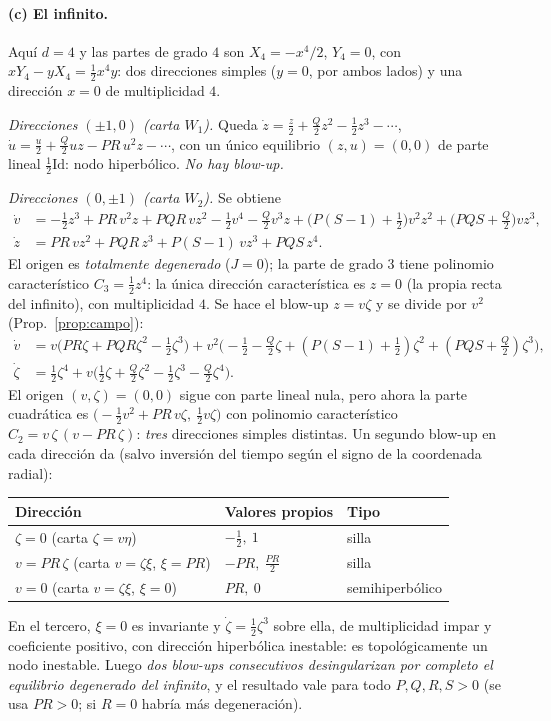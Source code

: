 \documentclass[11pt,a4paper,oneside]{book}
\theoremstyle{plain}
\theoremstyle{definition}
\theoremstyle{remark}
\begin{document}
\paragraph{(c) El infinito.} Aquí $d=4$ y las partes de grado $4$ son $X_4=-x^4/2$, $Y_4=0$, con $xY_4-yX_4=\tfrac12x^4y$: dos direcciones simples ($y=0$, por ambos lados) y una dirección $x=0$ de multiplicidad $4$.

\emph{Direcciones $(\pm1,0)$ (carta $W_1$).} Queda $\dot z=\tfrac z2+\tfrac Q2z^2-\tfrac12z^3-\cdots$, $\dot u=\tfrac u2+\tfrac Q2uz-PR\,u^2z-\cdots$, con un único equilibrio $(z,u)=(0,0)$ de parte lineal $\tfrac12\mathrm{Id}$: nodo hiperbólico. \emph{No hay blow-up.}

\emph{Direcciones $(0,\pm1)$ (carta $W_2$).} Se obtiene
\begin{align*}
\dot v&=-\tfrac12z^3+PR\,v^2z+PQR\,vz^2-\tfrac12v^4-\tfrac Q2v^3z+\big(P(S-1)+\tfrac12\big)v^2z^2+\big(PQS+\tfrac Q2\big)vz^3,\\
\dot z&=PR\,vz^2+PQR\,z^3+P(S-1)\,vz^3+PQS\,z^4 .
\end{align*}
El origen es \emph{totalmente degenerado} ($J=0$); la parte de grado $3$ tiene polinomio característico $C_3=\tfrac12z^4$: la única dirección característica es $z=0$ (la propia recta del infinito), con multiplicidad $4$. Se hace el blow-up $z=v\zeta$ y se divide por $v^2$ (Prop.~\ref{prop:campo}):
\begin{align*}
\dot v&=v\big(PR\zeta+PQR\zeta^2-\tfrac12\zeta^3\big)+v^2\big(-\tfrac12-\tfrac Q2\zeta+(P(S-1)+\tfrac12)\zeta^2+(PQS+\tfrac Q2)\zeta^3\big),\\
\dot\zeta&=\tfrac12\zeta^4+v\big(\tfrac12\zeta+\tfrac Q2\zeta^2-\tfrac12\zeta^3-\tfrac Q2\zeta^4\big).
\end{align*}
El origen $(v,\zeta)=(0,0)$ sigue con parte lineal nula, pero ahora la parte cuadrática es $\big(-\tfrac12v^2+PR\,v\zeta,\ \tfrac12v\zeta\big)$ con polinomio característico $C_2=v\,\zeta\,(v-PR\,\zeta)$: \emph{tres} direcciones simples distintas. Un segundo blow-up en cada dirección da (salvo inversión del tiempo según el signo de la coordenada radial):
\begin{center}
\begin{tabular}{@{}l l l@{}}
\toprule
Dirección & Valores propios & Tipo \\
\midrule
$\zeta=0$ (carta $\zeta=v\eta$) & $-\tfrac12,\ 1$ & silla \\
$v=PR\,\zeta$ (carta $v=\zeta\xi$, $\xi=PR$) & $-PR,\ \tfrac{PR}2$ & silla \\
$v=0$ (carta $v=\zeta\xi$, $\xi=0$) & $PR,\ 0$ & semihiperbólico \\
\bottomrule
\end{tabular}
\end{center}
En el tercero, $\xi=0$ es invariante y $\dot\zeta=\tfrac12\zeta^3$ sobre ella, de multiplicidad impar y coeficiente positivo, con dirección hiperbólica inestable: es topológicamente un nodo inestable. Luego \emph{dos blow-ups consecutivos desingularizan por completo el equilibrio degenerado del infinito}, y el resultado vale para todo $P,Q,R,S>0$ (se usa $PR>0$; si $R=0$ habría más degeneración).
\end{document}
